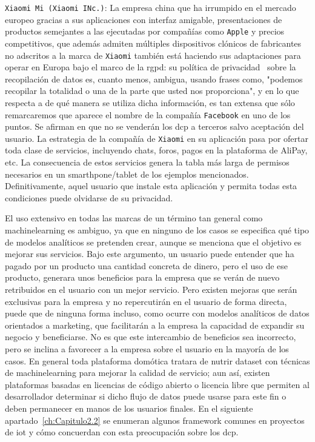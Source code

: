 \verb|Xiaomi Mi (Xiaomi INc.)|: La empresa china que ha irrumpido en el mercado europeo gracias a sus aplicaciones con interfaz amigable, presentaciones de productos semejantes a las ejecutadas por compañías como \verb|Apple| y precios competitivos, que además admiten múltiples dispositivos clónicos de fabricantes no adscritos a la marca de \verb|Xiaomi| también está haciendo sus adaptaciones para operar en Europa bajo el marco de la \gls{rgpd}: su política de privacidad~\cite{xiaomyprivacy} sobre la recopilación de datos es, cuanto menos, ambigua, usando frases como, "podemos recopilar la totalidad o una de la parte que usted nos proporciona", y en lo que respecta a de qué manera se utiliza dicha información, es tan extensa que sólo remarcaremos que aparece el nombre de la compañía \verb|Facebook| en uno de los puntos. Se afirman en que no se venderán los \gls{dcp} a terceros salvo aceptación del usuario. La estrategia de la compañía de \verb|Xiaomi| en su aplicación pasa por ofertar toda clase de servicios, incluyendo chats, foros, pagos en la plataforma de AliPay, etc. La consecuencia de estos servicios genera la tabla más larga de permisos necesarios en un smarthpone/tablet de los ejemplos mencionados. Definitivamente, aquel usuario que instale esta aplicación y permita todas esta condiciones puede olvidarse de su privacidad.


\vspace{1cm}

El uso extensivo en todas las marcas de un término tan general como \gls{machinelearning} es ambiguo, ya que en ninguno de los casos se especifica qué tipo de modelos analíticos se pretenden crear, aunque se menciona que el objetivo es mejorar sus servicios. Bajo este argumento, un usuario puede entender que ha pagado por un producto una cantidad concreta de dinero, pero el uso de ese producto, generara unos beneficios para la empresa que se verán de nuevo retribuidos en el usuario con un mejor servicio. Pero existen mejoras que serán exclusivas para la empresa y no repercutirán en el usuario de forma directa, puede que de ninguna forma incluso, como ocurre con modelos analíticos de datos orientados a marketing, que facilitarán a la empresa la capacidad de expandir su negocio y beneficiarse. No es que este intercambio de beneficios sea incorrecto, pero se inclina a favorecer a la empresa sobre el usuario en la mayoría de los casos. En general toda plataforma domótica tratara de nutrir \gls{dataset} con técnicas de \gls{machinelearning} para mejorar la calidad de servicio; aun así, existen plataformas basadas en licencias de código abierto o licencia libre que permiten al desarrollador determinar si dicho flujo de datos puede usarse para este fin o deben permanecer en manos de los usuarios finales. En el siguiente apartado~\ref{ch:Capitulo2.2} se enumeran algunos \gls{framework} comunes en proyectos de \gls{iot} y cómo concuerdan con esta preocupación sobre los \gls{dcp}.


